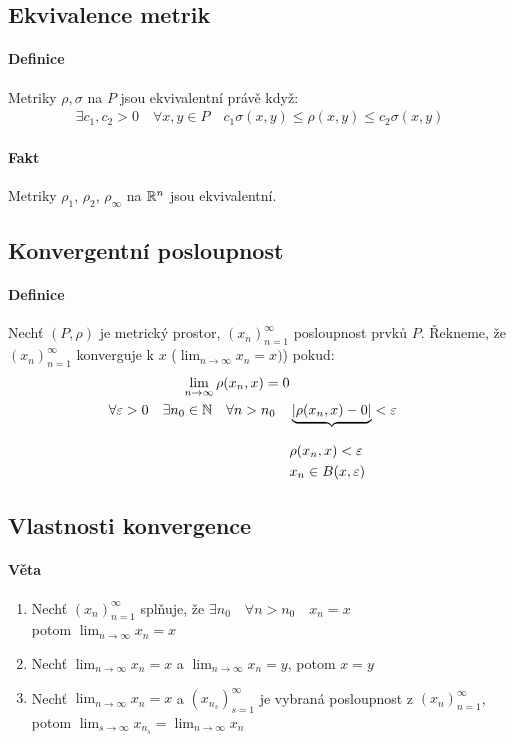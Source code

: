 \documentclass[a4paper,10pt]{article}
\begin{document}
\subsection{Ekvivalence metrik}
\setcounter{equation}{0}
\paragraph{Definice}
Metriky $\rho, \sigma$ na $P$ jsou ekvivalentní právě když:
\begin{align*}
	\exists c_1, c_2 > 0 \quad \forall x, y \in P\quad c_1 \sigma(x,y) \le
	\rho(x,y) \le c_2 \sigma(x,y)
\end{align*}
\paragraph{Fakt}
Metriky $\rho_1$, $\rho_2$, $\rho_\infty$ na $\mathbb{R}^n$ jsou ekvivalentní.

\subsection{Konvergentní posloupnost}
\setcounter{equation}{0}
\paragraph{Definice}
Nechť $(P, \rho)$ je metrický prostor, $(x_n)_{n=1}^\infty$ posloupnost prvků
$P$. Řekneme, že $(x_n)_{n=1}^\infty$ konverguje k $x$ ($\lim_{n\to\infty} x_n =
x)$) pokud:
\begin{align*}
	\lim_{n\to\infty} \rho(x_n, x) = 0 \\
	\forall \varepsilon > 0 \quad \exists n_0 \in \mathbb{N} \quad \forall n > n_0 \quad
	&\underbrace{|\rho(x_n,x) - 0|}_{} < \varepsilon\\
	&\rho(x_n,x) < \varepsilon\\
	&x_n \in B(x,\varepsilon)
\end{align*}

\subsection{Vlastnosti konvergence}
\setcounter{equation}{0}
\paragraph{Věta}
\begin{enumerate}
	\item Nechť $(x_n)_{n=1}^\infty$ splňuje, že $\exists n_0 \quad \forall n >
	n_0 \quad x_n = x$ \\
	potom $\lim_{n\to\infty} x_n = x$
	\item Nechť $\lim_{n\to\infty} x_n = x$ a $\lim_{n\to\infty} x_n = y$, potom $x = y$
	\item Nechť $\lim_{n\to\infty} x_n = x$ a $(x_{n_s})_{s=1}^\infty$ je vybraná
	posloupnost z $(x_n)_{n=1}^\infty$, potom $\lim_{s\to\infty} x_{n_s} =
	\lim_{n\to\infty} x_n$
\end{enumerate}
\end{document}
